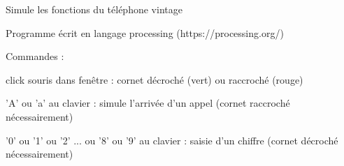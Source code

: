 Simule les fonctions du téléphone vintage

Programme écrit en langage processing (https://processing.org/)


Commandes :

  click souris dans fenêtre : cornet décroché (vert) ou raccroché (rouge)

  'A' ou 'a' au clavier : simule l'arrivée d'un appel (cornet raccroché nécessairement)

  '0' ou '1' ou '2' ... ou '8' ou '9' au clavier : saisie d'un chiffre (cornet décroché nécessairement)

